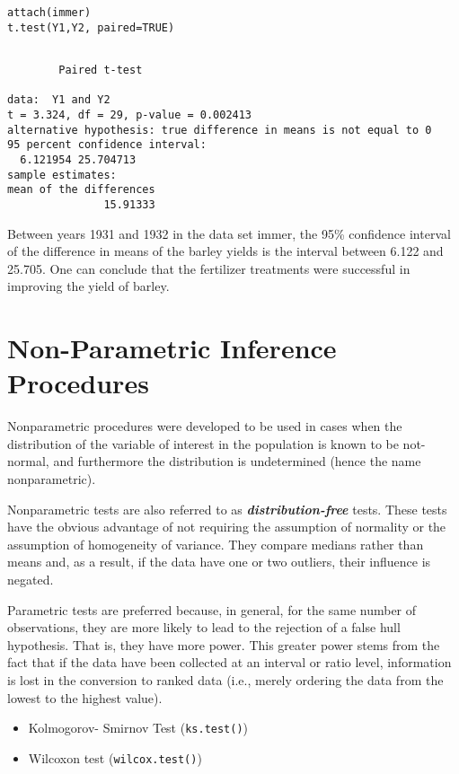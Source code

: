 \documentclass[a4paper,12pt]{article}
\begin{document}
\begin{framed}
\begin{verbatim}
attach(immer)
t.test(Y1,Y2, paired=TRUE)
\end{verbatim}
\end{framed}

\begin{verbatim}

        Paired t-test

data:  Y1 and Y2
t = 3.324, df = 29, p-value = 0.002413
alternative hypothesis: true difference in means is not equal to 0
95 percent confidence interval:
  6.121954 25.704713
sample estimates:
mean of the differences
               15.91333
\end{verbatim}
Between years 1931 and 1932 in the data set immer, the 95\% confidence interval of the difference in means of the barley yields is the interval between 6.122 and 25.705.
One can conclude that the fertilizer treatments were successful in improving the yield of barley.

\section{Non-Parametric Inference Procedures}
Nonparametric procedures were developed to be used in cases when the distribution of the variable of interest in the population is known to be not-normal, and furthermore the distribution is undetermined (hence the name nonparametric).

Nonparametric tests are also referred to as \textbf{\emph{distribution-free}} tests. These tests have the obvious advantage of not requiring the assumption of normality or the assumption of homogeneity of variance. They compare medians rather than means and, as a result, if the data have one or two outliers, their influence is negated.

Parametric tests are preferred because, in general, for the same number of observations, they are more likely to lead to the rejection of a false hull hypothesis. That is, they have more power. This greater power stems from the fact that if the data have been collected at an interval or ratio level, information is lost in the conversion to ranked data (i.e., merely ordering the data from the lowest to the highest value).

\begin{itemize}
\item Kolmogorov- Smirnov Test (\texttt{ks.test()})
\item Wilcoxon test (\texttt{wilcox.test()})
\end{itemize}
\end{document}
